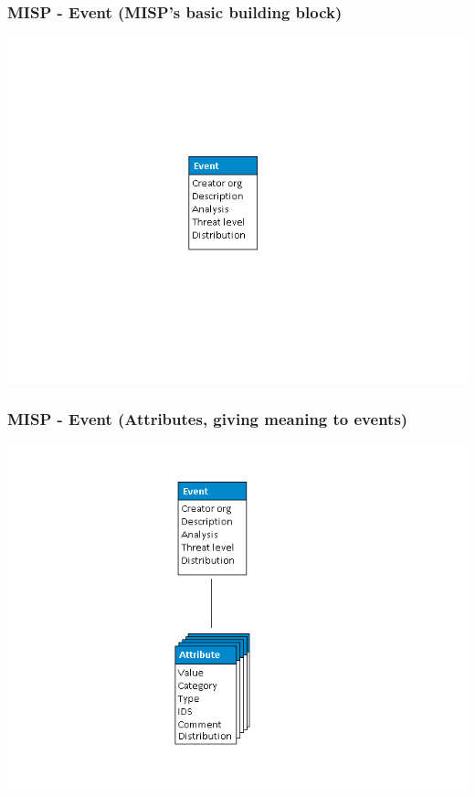 \begin{frame}
    \frametitle{MISP - Event (MISP's basic building block)}
    \includegraphics[scale=0.45]{screenshots/datamodel1.png}
\end{frame}

\begin{frame}
    \frametitle{MISP - Event (Attributes, giving meaning to events)}
    \includegraphics[scale=0.45]{screenshots/datamodel2.png}
\end{frame}

